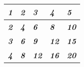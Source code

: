 \begin{table}[]
\begin{tabular}{|l|l|l|l|l|}
\hline
\textit{\textbf{1}} & \textit{\textbf{2}} & \textit{\textbf{3}}  & \textit{\textbf{4}}  & \textit{\textbf{5}}  \\ \hline
\textit{\textbf{2}} & \textit{\textbf{4}} & \textit{\textbf{6}}  & \textit{\textbf{8}}  & \textit{\textbf{10}} \\ \hline
\textit{\textbf{3}} & \textit{\textbf{6}} & \textit{\textbf{9}}  & \textit{\textbf{12}} & \textit{\textbf{15}} \\ \hline
\textit{\textbf{4}} & \textit{\textbf{8}} & \textit{\textbf{12}} & \textit{\textbf{16}} & \textit{\textbf{20}} \\ \hline
\end{tabular}
\end{table}